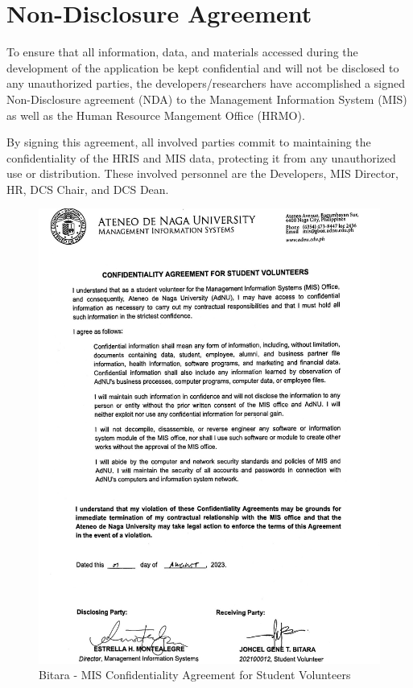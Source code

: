 \chapter{Non-Disclosure Agreement}

\label{nda}

To ensure that all information, data, and materials accessed during the development of the application be kept confidential and will not be disclosed to any unauthorized parties, the developers/researchers have accomplished a signed Non-Disclosure agreement (NDA) to the Management Information System (MIS) as well as the Human Resource Mangement Office (HRMO). 

By signing this agreement, all involved parties commit to maintaining the confidentiality of the HRIS and MIS data, protecting it from any unauthorized use or distribution. These involved personnel are the Developers, MIS Director, HR, DCS Chair, and DCS Dean.

\begin{figure}[H]
    \centering
    \includegraphics[width=1\textwidth]{figures/images/nda/mis-nda-bitara.JPG}
    \caption{Bitara - MIS Confidentiality Agreement for Student Volunteers}
    \label{fig:mis-nda-bitara}
\end{figure}

